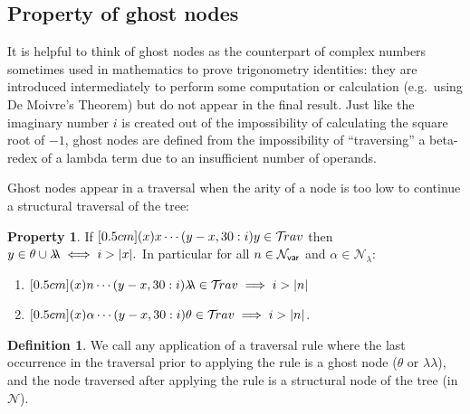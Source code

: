 \documentclass{article}
\theoremstyle{definition}
\newtheorem{definition}{Definition}[section]
\newtheorem{property}{Property}[section]
\newcommand\Nodes{\mathcal{N}}%
\newcommand\NodesVar{\Nodes_{\sf var}}%
\newcommand\NodesLmd{\Nodes_\lambda}%
\newcommand{\ghostlmd}{{\lambda\!\!\lambda}}
\newcommand{\ghostvar}{\theta}
\newcommand{\travulc}{\travset}
\begin{document}
\subsection{Property of ghost nodes}

It is helpful to think of ghost nodes as the counterpart of complex numbers sometimes used in mathematics
to prove trigonometry identities: they are introduced intermediately to perform some computation or calculation (e.g.\ using De Moivre's Theorem) but do not appear in the final result. Just like the imaginary number $i$ is created out of the impossibility of calculating the square root of $-1$, ghost nodes are defined from the impossibility of ``traversing'' a beta-redex of a lambda term due to an insufficient number of operands.


Ghost nodes appear in a traversal when the arity of a node is too low to continue a
structural traversal of the tree:
\begin{property}
\label{prop:ghost_justifier_arity}
If $\Pstr[0.5cm]{(x){x} \cdots (y-x,30:i){y}} \in \travulc$ then
$ y \in \ghostvar \union \ghostlmd \iff i > |x|.$
In particular for all $n\in\NodesVar$ and $\alpha\in\NodesLmd$:
\begin{enumerate}
\item $\Pstr[0.5cm]{(x){n} \cdots (y-x,30:i){\ghostlmd}} \in \travulc \implies i > |n|$
\item $\Pstr[0.5cm]{(x){\alpha} \cdots (y-x,30:i){\ghostvar}} \in \travulc \implies i > |n|$.
\end{enumerate}
\end{property}

\begin{definition}
We call  any application of a traversal rule where the last occurrence in the traversal prior to applying the rule is a ghost node ($\ghostvar$ or $\ghostlmd$), and the node traversed after applying the rule is a structural node of the tree (in $\Nodes$).
\end{definition}
\end{document}
